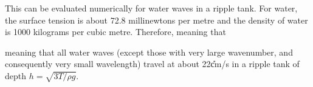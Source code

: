 \documentclass[12pt]{book}
\begin{document}
{This can be evaluated numerically for water waves in a ripple tank.  For water, the surface tension is about 72.8 millinewtons per metre and the density of water is 1000 kilograms per cubic metre.  Therefore,
meaning that 

meaning that all water waves (except those with very large wavenumber, and consequently very small wavelength) travel at about 22\U{cm/s} in a ripple tank of depth $h=\sqrt{3T/\rho g}$.








}
\end{document}
